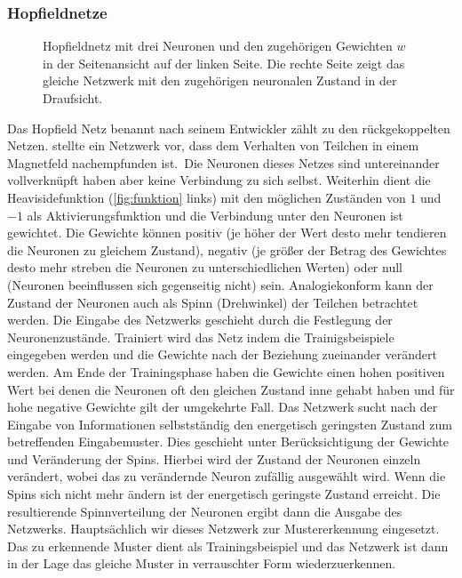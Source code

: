 \subsubsection{Hopfieldnetze}%
\begin{figure}[!htb]
    \centering
        
    \caption{Hopfieldnetz mit drei Neuronen und den zugehörigen Gewichten $w$ in der Seitenansicht auf der linken Seite. Die rechte Seite zeigt das gleiche Netzwerk mit den zugehörigen neuronalen Zustand in der Draufsicht.\,\protect\footnotemark{}}
    \label{fig:Hopfield}
\end{figure}
\addtocounter{footnote}{-1}     %
\addtocounter{Hfootnote}{-1}    %
\wrapfigfoot{}
Das Hopfield Netz benannt nach seinem Entwickler zählt zu den rückgekoppelten Netzen. \citet{HOPFIELD1986} stellte ein Netzwerk vor, dass dem Verhalten von Teilchen in einem Magnetfeld nachempfunden ist.\, Die Neuronen dieses Netzes sind untereinander vollverknüpft haben aber keine Verbindung zu sich selbst. Weiterhin dient die Heavisidefunktion (\autoref{fig:funktion} links) mit den möglichen Zuständen von $1$ und $-1$ als Aktivierungsfunktion und die Verbindung unter den Neuronen ist gewichtet. Die Gewichte können positiv (je höher der Wert desto mehr tendieren die Neuronen zu gleichem Zustand), negativ (je größer der Betrag des Gewichtes desto mehr streben die Neuronen zu unterschiedlichen Werten) oder null (Neuronen beeinflussen sich gegenseitig nicht) sein. Analogiekonform kann der Zustand der Neuronen auch als Spinn (Drehwinkel) der Teilchen betrachtet werden. Die Eingabe des Netzwerks geschieht durch die Festlegung der Neuronenzustände. Trainiert wird das Netz indem die Trainigsbeispiele eingegeben werden und die Gewichte nach der Beziehung zueinander verändert werden. Am Ende der Trainingsphase haben die Gewichte einen hohen positiven Wert bei denen die Neuronen oft den gleichen Zustand inne gehabt haben und für hohe negative Gewichte gilt der umgekehrte Fall. Das Netzwerk sucht nach der Eingabe von Informationen selbstständig den energetisch geringsten Zustand zum betreffenden Eingabemuster. Dies geschieht unter Berücksichtigung der Gewichte und Veränderung der Spins. Hierbei wird der Zustand der Neuronen einzeln verändert, wobei das zu verändernde Neuron zufällig ausgewählt wird. Wenn die Spins sich nicht mehr ändern ist der energetisch geringste Zustand erreicht. Die resultierende Spinnverteilung der Neuronen ergibt dann die Ausgabe des Netzwerks. Hauptsächlich wir dieses Netzwerk zur Mustererkennung eingesetzt. Das zu erkennende Muster dient als Trainingsbeispiel und das Netzwerk ist dann in der Lage das gleiche Muster in verrauschter Form wiederzuerkennen.


